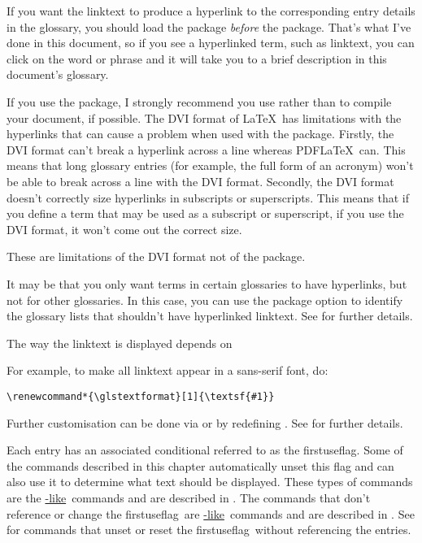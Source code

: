 \documentclass[report,inlinetitle]{nlctdoc}
\newcommand{\glslike}{\hyperref[sec:gls-like]{\cs{gls}-like}}
\newcommand{\glstextlike}{\hyperref[sec:glstext-like]{\cs{glstext}-like}}
\newcommand*{\firstuseflag}{\gls{firstuseflag}}
\begin{document}
If you want the \gls{linktext} to produce a hyperlink to the
corresponding entry details in the glossary, you should load the
 package \emph{before} the 
package. That's what I've done in this document, so if you see a
hyperlinked term, such as \gls{linktext}, you can click on the word
or phrase and it will take you to a brief description in this
document's glossary.

\begin{important}
If you use the  package, I strongly recommend you use
 rather than  to compile your document, if
possible. The DVI format of \LaTeX\ has limitations with the
hyperlinks that can cause a problem when used with the
 package. Firstly, the DVI format can't break a
hyperlink across a line whereas PDF\LaTeX\ can. This means that long
glossary entries (for example, the full form of an acronym) won't be
able to break across a line with the DVI format. Secondly, the DVI
format doesn't correctly size hyperlinks in subscripts or
superscripts. This means that if you define a term that may be used
as a subscript or superscript, if you use the DVI format, it won't
come out the correct size.

These are limitations of the DVI format not of the 
package.
\end{important}

It may be that you only want terms in certain glossaries to have
hyperlinks, but not for other glossaries. In this case, you can use the
package option  to identify the glossary lists
that shouldn't have hyperlinked \gls{linktext}. See 
 for further details.

The way the \gls{linktext} is displayed depends on 
\begin{definition}[\DescribeMacro{\glstextformat}]
\end{definition}
For example, to make all \gls{linktext} appear in a sans-serif
font, do:
\begin{verbatim}
\renewcommand*{\glstextformat}[1]{\textsf{#1}}
\end{verbatim}
Further customisation can be done via  or by
redefining . See  for
further details.

Each entry has an associated conditional referred to as the
\firstuseflag. Some of the commands described in this chapter
automatically unset this flag and can also use it
to determine what text should be displayed. These types of commands
are the \glslike\ commands and are described in
. The commands that don't reference or change
the \firstuseflag\ are \glstextlike\ commands and are described
in .  See  for 
commands that unset or reset the \firstuseflag\ without referencing
the entries.
\end{document}
